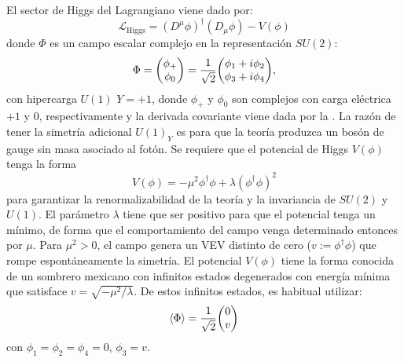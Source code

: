 El sector de Higgs del Lagrangiano viene dado por:
\begin{equation}
    \mathcal{L}_{\text{Higgs}} = \left(D^{\mu} \phi\right)^{\dagger} \left(D_{\mu} \phi\right) - V(\phi)
\end{equation}
donde \(\Phi\) es un campo escalar complejo en la representación \(SU(2)\):
\begin{equation}
    \Phi = \mqty( \phi_{+} \\ \phi_0 ) = \frac{1}{\sqrt{2}} \mqty(\phi_1 + i \phi_2 \\ \phi_3 + i \phi_4),
\end{equation}
con hipercarga \(U(1)\) \(Y=+1\), donde \(\phi_{+}\) y \(\phi_{0}\) son complejos con carga eléctrica \(+1\) y \(0\), respectivamente y la derivada covariante viene dada por la \Eqn{\ref{eq:theory:sm:mathematical:ew:covariant_derivative}}. La razón de tener la simetría adicional \(U(1)_Y\) es para que la teoría produzca un bosón de gauge sin masa asociado al fotón. Se requiere que el potencial de Higgs \(V(\phi)\) tenga la forma
\begin{equation}
    V(\phi) = -\mu^2 \phi^{\dagger} \phi + \lambda \left(\phi^{\dagger} \phi\right)^2
\end{equation}
para garantizar la renormalizabilidad de la teoría y la invariancia de \(SU(2)\) y \(U(1)\). El parámetro \(\lambda\) tiene que ser positivo para que el potencial tenga un mínimo, de forma que el comportamiento del campo venga determinado entonces por \(\mu\). Para \(\mu^2 > 0\), el campo genera un \ac{VEV} distinto de cero (\(v := \phi^{\dagger} \phi\)) que rompe espontáneamente la simetría. El potencial \(V(\phi)\) tiene la forma conocida de un sombrero mexicano con infinitos estados degenerados con energía mínima que satisface \(v = \sqrt{-\mu^2/\lambda}\). De estos infinitos estados, es habitual utilizar:
\begin{equation}
    \expval{\Phi} = \frac{1}{\sqrt{2}} \mqty(0\\v)
\end{equation}
con \(\phi_1 = \phi_2 = \phi_4 = 0\), \(\phi_3 = v\).

